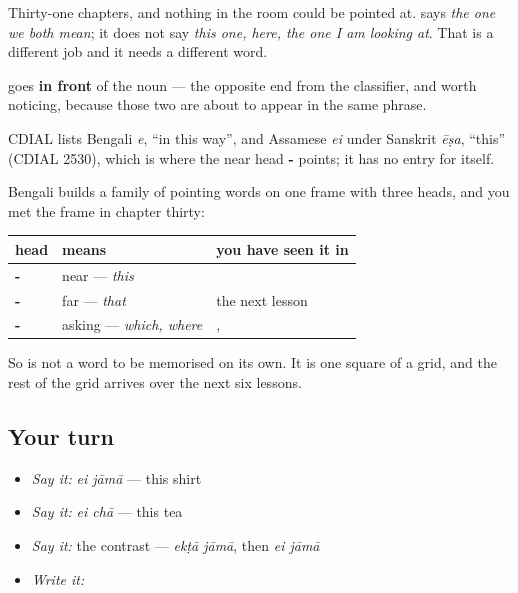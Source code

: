 Thirty-one chapters, and nothing in the room could be pointed at. \textbf{} says \emph{the one we both mean}; it does not say \emph{this one, here, the one I am looking at}. That is a different job and it needs a different word.

\textbf{} goes \textbf{in front} of the noun — the opposite end from the classifier, and worth noticing, because those two are about to appear in the same phrase.

\begin{cousinweb}
CDIAL lists Bengali \emph{e}, \textquotedblleft{}in this way\textquotedblright{}, and Assamese \emph{ei} under Sanskrit \emph{ēṣa}, \textquotedblleft{}this\textquotedblright{} (CDIAL 2530), which is where the near head \textbf{-} points; it has no entry for \textbf{} itself.
\end{cousinweb}

\begin{grammarlens}[title={Grammar Lens: the near head}]
Bengali builds a family of pointing words on one frame with three heads, and you met the frame in chapter thirty:

\noindent
\begin{tabularx}{\linewidth}{@{}>{\raggedright\arraybackslash}X>{\raggedright\arraybackslash}X>{\raggedright\arraybackslash}X@{}}
\toprule
\textbf{head} & \textbf{means} & \textbf{you have seen it in} \\
\midrule
\textbf{\bn{এ}-} & near — \emph{this} & \textbf{\bn{এই}} \\
\textbf{\bn{ও}-} & far — \emph{that} & the next lesson \\
\textbf{\bn{ক}-} & asking — \emph{which, where} & \textbf{\bn{কেমন}}, \textbf{\bn{কখন}} \\
\bottomrule
\end{tabularx}

So \textbf{} is not a word to be memorised on its own. It is one square of a grid, and the rest of the grid arrives over the next six lessons.
\end{grammarlens}

\subsection*{Your turn}
\begin{itemize}
\raggedright
  \item \emph{Say it:} \emph{ei jāmā} — this shirt
  \item \emph{Say it:} \emph{ei chā} — this tea
  \item \emph{Say it:} the contrast — \emph{ekṭā jāmā}, then \emph{ei jāmā}
  \item \emph{Write it:} 
\end{itemize}

